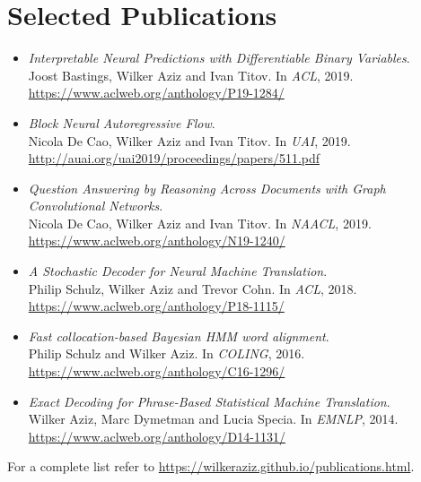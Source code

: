 \section*{Selected Publications}




\begin{itemize}
	 \setlength\itemsep{1pt}
	\item \emph{Interpretable Neural Predictions with Differentiable Binary Variables}.\\
	Joost Bastings, Wilker Aziz and Ivan Titov. In \emph{ACL}, 2019. \\
	\url{https://www.aclweb.org/anthology/P19-1284/}	
	\item \emph{Block Neural Autoregressive Flow}.\\
	Nicola De Cao, Wilker Aziz and Ivan Titov. In \emph{UAI}, 2019. \\
	\url{http://auai.org/uai2019/proceedings/papers/511.pdf}
	\item \emph{Question Answering by Reasoning Across Documents with Graph Convolutional Networks}.\\
	Nicola De Cao, Wilker Aziz and Ivan Titov. In \emph{NAACL}, 2019.\\
	\url{https://www.aclweb.org/anthology/N19-1240/}
	\item \emph{A Stochastic Decoder for Neural Machine Translation}.\\
	Philip Schulz, Wilker Aziz and Trevor Cohn. In \emph{ACL}, 2018.  \\
	\url{https://www.aclweb.org/anthology/P18-1115/}
	\item \emph{Fast collocation-based Bayesian HMM word alignment}. \\
	Philip Schulz and Wilker Aziz. In \emph{COLING}, 2016. \\
	\url{https://www.aclweb.org/anthology/C16-1296/}
	\item \emph{Exact Decoding for Phrase-Based Statistical Machine Translation}. \\
	Wilker Aziz, Marc Dymetman and Lucia Specia. In \emph{EMNLP}, 2014.\\
	\url{https://www.aclweb.org/anthology/D14-1131/}
\end{itemize}

For a complete list refer to \url{https://wilkeraziz.github.io/publications.html}. 



